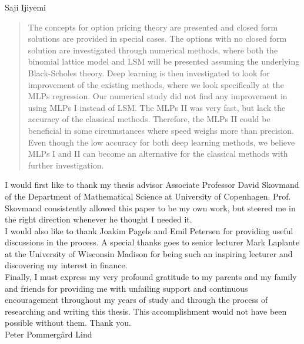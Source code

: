 \documentclass[
11pt, %
oneside, %
english, %
singlespacing, %
headsepline, %
]{MastersDoctoralThesis} %
\theoremstyle{assumption}
\theoremstyle{definition}
\theoremstyle{proposition}
\begin{document}
\hfill Saji Ijiyemi


\begin{abstract}
\addchaptertocentry{\abstractname} %
The concepts for option pricing theory are presented and closed form solutions are provided in special cases. The options with no closed form solution are investigated through numerical methods, where both the binomial lattice model and LSM will be presented assuming the underlying Black-Scholes theory. Deep learning is then investigated to look for improvement of the existing methods, where we look specifically at the MLPs regression. Our numerical study did not find any improvement in using MLPs I instead of LSM. The MLPs II was very fast, but lack the accuracy of the classical methods. Therefore, the MLPs II could be beneficial in some circumstances where speed weighs more than precision. Even though the low accuracy for both deep learning methods, we believe MLPs I and II can become an alternative for the classical methods with further investigation.
\end{abstract}


\begin{acknowledgements}
\addchaptertocentry{\acknowledgementname} %
I would first like to thank my thesis advisor Associate Professor David Skovmand of the Department of Mathematical Science at University of Copenhagen. Prof. Skovmand consistently allowed this paper to be my own work, but steered me in the right direction whenever he thought I needed it.\\

I would also like to thank Joakim Pagels and Emil Petersen for providing useful discussions in the process. A special thanks goes to senior lecturer Mark Laplante at the University of Wisconsin Madison for being such an inspiring lecturer and discovering my interest in finance.\\

Finally, I must express my very profound gratitude to my parents and my family and friends for providing me with unfailing support and continuous encouragement throughout my years of study and through the process of researching and writing this thesis. This accomplishment would not have been possible without them. Thank you.\\

Peter Pommergård Lind
\end{acknowledgements}
\end{document}
